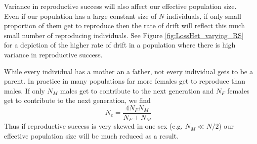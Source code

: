 
Variance in reproductive success will also affect our effective
population size. Even if our population has a large constant size of $N$
individuals, if only small proportion of them get to reproduce then
the rate of drift will reflect this much small number of reproducing
individuals. See Figure \ref{fig:LossHet_varying_RS} for a depiction of the higher rate of drift
in a population where there is high variance in reproductive success.


While every individual has a mother an a father, not every individual
gets to be a parent. In practice in many populations far more females
get to reproduce than males. If only $N_M$ males get to contribute to the next
generation and $N_F$ females get to contribute to the next
generation, we find
\begin{equation}
N_e = \frac{4N_FN_M}{N_F+N_M}
\end{equation}
Thus if reproductive success is very skewed in one sex (e.g. $N_M \ll
N/2$) our effective population size will be much reduced as a result.\\

